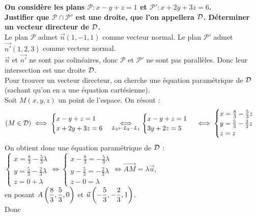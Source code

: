 \documentclass[a4paper, 11pt]{article}
\begin{document}
\begin{correction}  \;
	\textbf{On consid\`ere les plans $\mathcal{P} : x-y+z=1$ et $\mathcal{P}' : x + 2y +3z =6$. \\
		Justifier que $\mathcal{P}\cap \mathcal{P}'$ est une droite, que l'on appellera $\cal D$. D\'eterminer un vecteur directeur de $\cal D$.}\\
	Le plan $\mathcal{P}$ admet $\vec{n}(1,-1,1)$ comme vecteur normal. Le plan $\mathcal{P}'$ admet $\vec{n'}(1,2,3)$ comme vecteur normal.\\
	$\vec{n}$ et $\vec{n'}$ ne sont pas colin\'eaires, donc $\mathcal{P}$ et $\mathcal{P}'$ ne sont pas parall\`eles. Donc leur intersection est une droite $\cal D$.\\
	Pour trouver un vecteur directeur, on cherche une \'equation param\'etrique de $\cal D$ (sachant qu'on en a une \'equation cart\'esienne).\\
	Soit $M(x,y,z)$ un point de l'espace. On r\'esout :
	$$ \left(M \in {\cal D}\right)  \iff  \begin{cases} x-y+z=1 \\ x + 2y +3z =6\end{cases}
		\underset{L_2 \leftarrow L_2-L_1}{\iff}  \begin{cases} x-y+z=1 \\ 3y +2z =5\end{cases}
		\iff  \begin{cases} x=\frac{8}{3}-\frac{5}{3}z \\ y =\frac{5}{3}-\frac{2}{3}z \\ z=z\end{cases}$$
	On obtient donc une \'equation param\'etrique de $\cal D$ : $ \begin{cases} x=\frac{8}{3}-\frac{5}{3}\lambda \\ y =\frac{5}{3}-\frac{2}{3}\lambda \\ z=0+\lambda\end{cases} \iff \begin{cases} x-\frac{8}{3}=-\frac{5}{3}\lambda \\ y -\frac{5}{3}=-\frac{2}{3}\lambda \\ z-0=\lambda\end{cases} \iff \overrightarrow{AM}=\lambda \vec{u}$,\\
	en posant $\displaystyle A\left(\frac{8}{3},\frac{5}{3},0\right)$ et $\displaystyle \vec{u}\left(-\frac{5}{3},-\frac{2}{3},1\right)$.\\
	Donc 
\end{correction}
\end{document}
